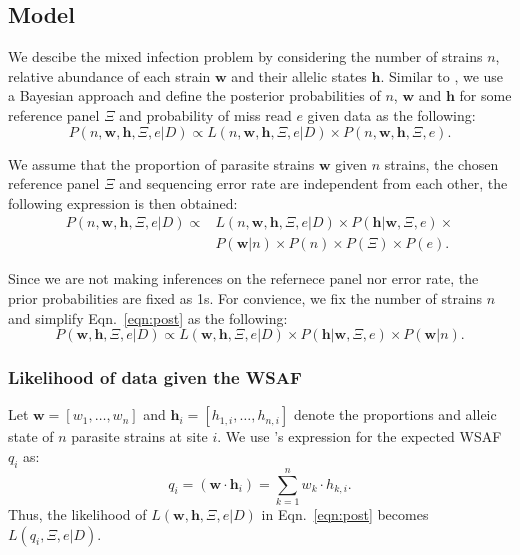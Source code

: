 \documentclass{bioinfo}
\begin{document}
\subsection{Model}
We descibe the mixed infection problem by considering the number of strains $n$, relative abundance of each strain $\mathbf{w}$ and their allelic states $\mathbf{h}$. Similar to \citet{Jack2016}, we use a Bayesian approach and define the posterior probabilities of $n$, $\mathbf{w}$ and $\mathbf{h}$ for some reference panel $\Xi$ and probability of miss read $e$ given data as the following:
$$P(n, \mathbf{w}, \mathbf{h}, \Xi, e |D) \propto L(n, \mathbf{w}, \mathbf{h}, \Xi, e|D) \times P(n, \mathbf{w}, \mathbf{h}, \Xi, e).
$$

We assume that the proportion of parasite strains $\mathbf{w}$ given $n$ strains, the chosen reference panel $\Xi$ and sequencing error rate are independent from each other, the following expression is then obtained:
\begin{equation}
\begin{split}
P(n, \mathbf{w}, \mathbf{h}, \Xi, e|D) \propto & L(n, \mathbf{w}, \mathbf{h}, \Xi, e | D) \times P(\mathbf{h}|\mathbf{w}, \Xi, e) \times \\
                                               & P(\mathbf{w}|n) \times P(n) \times P(\Xi) \times P(e).\label{eqn:post:old}
\end{split}
\end{equation}

Since we are not making inferences on the refernece panel nor error rate, the prior probabilities are fixed as 1s. For convience, we fix the number of strains $n$ and simplify Eqn.~\eqref{eqn:post} as the following:
\begin{equation}
P(\mathbf{w}, \mathbf{h}, \Xi, e |D) \propto L(\mathbf{w}, \mathbf{h}, \Xi, e|D) \times P(\mathbf{h}|\mathbf{w}, \Xi, e) \times P(\mathbf{w}|n). \label{eqn:post}
\end{equation}

\subsubsection{Likelihood of data given the WSAF}
Let $\mathbf w = [w_1,\dots, w_n]$ and $\mathbf{h}_i = [h_{1,i},\dots,h_{n,i}]$ denote the proportions and alleic state of $n$ parasite strains at site $i$. We use \citet{Jack2016}'s expression for the expected WSAF $q_{i}$ as:
\begin{equation}
q_i= (\mathbf{w}\cdot\mathbf{h}_{i})  =  \sum_{k=1}^{n} w_k \cdot h_{k,i} .\label{eqn:qij_full_sum}
\end{equation}
Thus, the likelihood of $L(\mathbf{w}, \mathbf{h},\Xi, e|D)$ in Eqn.~\eqref{eqn:post} becomes $L(q_{i},\Xi, e|D)$. %
\end{document}
